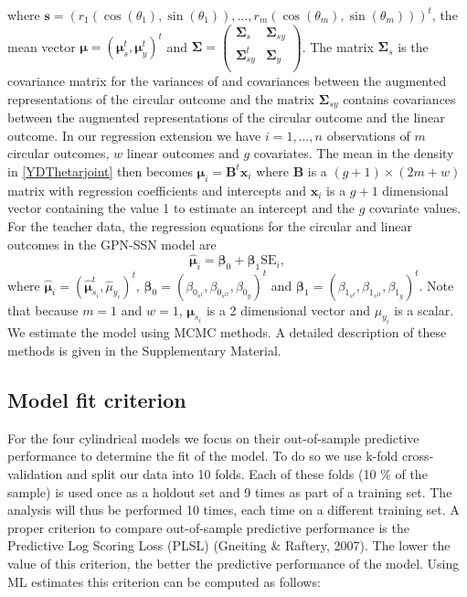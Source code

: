 \documentclass[12pt,]{article}
\begin{document}
\noindent where
\(\boldsymbol{s} = (r_1(\cos(\theta_1), \sin(\theta_1)), \dots, r_m(\cos(\theta_m), \sin(\theta_m)))^t\),
the mean vector
\(\boldsymbol{\mu} = (\boldsymbol{\mu}_s^t, \boldsymbol{\mu}_y^t)^t\)
and
\(\boldsymbol{\Sigma} = \left ( \begin{matrix} \boldsymbol{\Sigma}_s & \boldsymbol{\Sigma}_{sy} \\ \boldsymbol{\Sigma}_{sy}^t & \boldsymbol{\Sigma}_y \\ \end{matrix} \right )\).
The matrix \(\boldsymbol{\Sigma}_s\) is the covariance matrix for the
variances of and covariances between the augmented representations of
the circular outcome and the matrix \(\boldsymbol{\Sigma}_{sy}\)
contains covariances between the augmented representations of the
circular outcome and the linear outcome. \newline
\indent In our regression extension we have \(i = 1, \dots, n\)
observations of \(m\) circular outcomes, \(w\) linear outcomes and \(g\)
covariates. The mean in the density in \eqref{YDThetarjoint} then
becomes \(\boldsymbol{\mu}_i = \boldsymbol{B}^t\boldsymbol{x}_i\) where
\(\boldsymbol{B}\) is a \((g + 1) \times (2m + w)\) matrix with
regression coefficients and intercepts and \(\boldsymbol{x}_i\) is a
\(g + 1\) dimensional vector containing the value 1 to estimate an
intercept and the \(g\) covariate values. \newline
\indent For the teacher data, the regression equations for the circular
and linear outcomes in the GPN-SSN model are
\[\hat{\boldsymbol{\mu}}_{i} = \boldsymbol{\beta}_0 +
\boldsymbol{\beta}_1\text{SE}_i,\] where
\(\hat{\boldsymbol{\mu}}_i = (\hat{\boldsymbol{\mu}}_{s_i}^t, \hat{\mu}_{y_i})^t\),
\(\boldsymbol{\beta}_0 = (\beta_{0_{s^{I}}}, \beta_{0_{s^{II}}},\beta_{0_y})^t\)
and
\(\boldsymbol{\beta}_1 = (\beta_{1_{s^{I}}}, \beta_{1_{s^{II}}},\beta_{1_y})^t\).
Note that because \(m = 1\) and \(w = 1\), \(\boldsymbol{\mu}_{s_i}\) is
a 2 dimensional vector and \(\mu_{y_i}\) is a scalar. We estimate the
model using MCMC methods. A detailed description of these methods is
given in the Supplementary Material.

\subsection{Model fit criterion}\label{Modelfit}

For the four cylindrical models we focus on their out-of-sample
predictive performance to determine the fit of the model. To do so we
use k-fold cross-validation and split our data into 10 folds. Each of
these folds (10 \(\%\) of the sample) is used once as a holdout set and
9 times as part of a training set. The analysis will thus be performed
10 times, each time on a different training set.\newline
\indent A proper criterion to compare out-of-sample predictive
performance is the Predictive Log Scoring Loss (PLSL) (Gneiting \&
Raftery, 2007). The lower the value of this criterion, the better the
predictive performance of the model. Using ML estimates this criterion
can be computed as follows:
\end{document}
